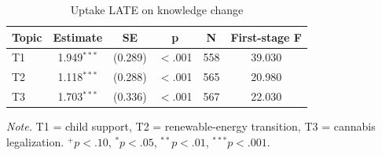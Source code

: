 \begin{table}[htbp]
\centering
\begin{threeparttable}
\caption{Uptake LATE on knowledge change}
\label{tab:tab_knowledge_late}
\begin{tabular}{lccccc}
\toprule
  Topic & Estimate & SE & p & N & First-stage F \\
\midrule
  T1 & 1.949$^{***}$ & (0.289) & $<$.001 & 558 & 39.030 \\
  T2 & 1.118$^{***}$ & (0.288) & $<$.001 & 565 & 20.980 \\
  T3 & 1.703$^{***}$ & (0.336) & $<$.001 & 567 & 22.030 \\
\bottomrule
\end{tabular}
\begin{tablenotes}\footnotesize\item \textit{Note.} T1 = child support, T2 = renewable-energy transition, T3 = cannabis legalization. $^{+}p<.10$, $^{*}p<.05$, $^{**}p<.01$, $^{***}p<.001$.\end{tablenotes}
\end{threeparttable}
\end{table}
